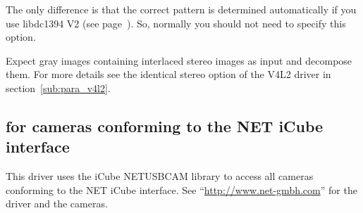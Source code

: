 \begin{description}
  The only difference is that the correct pattern is determined
  automatically if you use libdc1394 V2 (see
  page~). So, normally you should not
  need to specify this option.
\item[stereo=raw\textbar{}deinter] Expect gray images containing
  interlaced stereo images as input and decompose them. For more
  details see the identical stereo option of the V4L2 driver in
  section~\ref{sub:para_v4l2}.
\end{description}

\subsection { for cameras conforming to the NET
  iCube interface}

This driver uses the iCube NETUSBCAM library to access all cameras
conforming to the NET iCube interface. See
``\url{http://www.net-gmbh.com}'' for the driver and the cameras.
